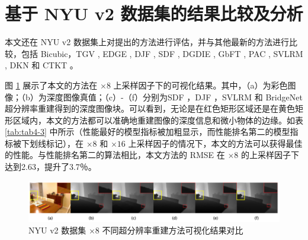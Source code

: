\section{基于 NYU v2 数据集的结果比较及分析}

本文还在 NYU v2 数据集上对提出的方法进行评估，并与其他最新的方法进行比较，包括 Bicubic，TGV \cite{DBLP:conf/iccv/FerstlRRRB13}, EDGE \cite{ParkKTBK11}, DJF \cite{DBLP:conf/eccv/LiHA016}, SDF \cite{DBLP:journals/pami/HamCP18}, DGDIE \cite{DBLP:conf/cvpr/GuZGCCZ17}, GbFT \cite{DBLP:conf/iccv/AlbaharH19}, PAC \cite{DBLP:conf/cvpr/SuJSGLK19}, SVLRM \cite{DBLP:conf/cvpr/PanDRLT019}, DKN \cite{DBLP:journals/corr/abs-1903-11286} 和 CTKT \cite{Sun2021cvpr}。

图 \ref{fig:fig4-4} 展示了本文的方法在 $\times 8$ 上采样因子下的可视化结果。其中，（a）为彩色图像；（b）为深度图像真值；（c）-（f）分别为SDF  \cite{DBLP:journals/pami/HamCP18}，DJF  \cite{DBLP:conf/eccv/LiHA016}，SVLRM  \cite{DBLP:conf/cvpr/PanDRLT019} 和 BridgeNet 超分辨率重建得到的深度图像块。可以看到，无论是在红色矩形区域还是在黄色矩形区域内，本文的方法都可以准确地重建图像的深度信息和微小物体的边缘。如表 \ref{tab:tab4-3} 中所示（性能最好的模型指标被加粗显示，而性能排名第二的模型指标被下划线标记），在 $\times 8$ 和 $\times 16$ 上采样因子的情况下，本文的方法可以获得最佳的性能。与性能排名第二的算法相比，本文方法的 RMSE 在 $\times 8$ 的上采样因子下达到2.63，提升了3.7％。

\begin{figure}[!htbp]
	\centering
	\includegraphics[scale=0.98]{figures/30.png}
	\caption{NYU v2 数据集 $\times 8$ 不同超分辨率重建方法可视化结果对比}
	\label{fig:fig4-4}
\end{figure}

